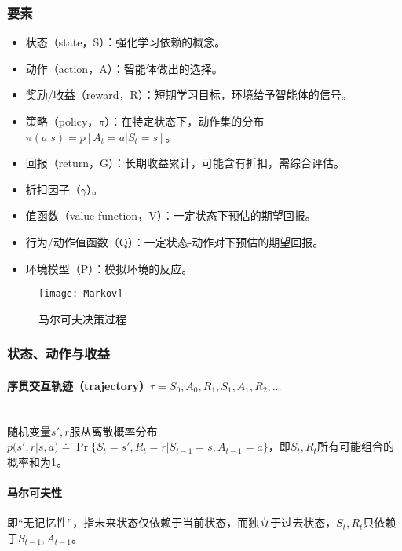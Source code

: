 \documentclass[
12pt, %
a4paper, 
oneside, %
headinclude,footinclude, %
]{scrartcl}
\begin{document}
\subsubsection{要素}
\begin{itemize}
\item 状态（state，S）：强化学习依赖的概念。
\item 动作（action，A）：智能体做出的选择。
\item 奖励/收益（reward，R）：短期学习目标，环境给予智能体的信号。
\item 策略（policy，$ \pi $）：在特定状态下，动作集的分布$ \pi(a|s) = p[A_t = a|S_t = s] $。
\item 回报（return，G）：长期收益累计，可能含有折扣，需综合评估。
\item 折扣因子（$ \gamma $）。
\item 值函数（value function，V）：一定状态下预估的期望回报。
\item 行为/动作值函数（Q）：一定状态-动作对下预估的期望回报。
\item 环境模型（P）：模拟环境的反应。
\end{itemize}

\begin{figure}[H]
\centering 
\texttt{[image: Markov]} 
\caption[马尔可夫决策过程]{马尔可夫决策过程}
\end{figure}
\subsubsection{状态、动作与收益}
\paragraph{序贯交互轨迹（trajectory）$ \tau =  S_0, A_0, R_1, S_1, A_1, R_2, \dots $}~\\

随机变量$ s',r $服从离散概率分布$ p(s', r|s, a) \doteq \Pr\{S_t = s', R_t = r|S_{t - 1} = s, A_{t - 1} = a\} $，即$ S_t,R_t $所有可能组合的概率和为1。
\paragraph{马尔可夫性}
即“无记忆性”，指未来状态仅依赖于当前状态，而独立于过去状态，$ S_t,R_t $只依赖于$ S_{t - 1},A_{t - 1} $。
\end{document}
